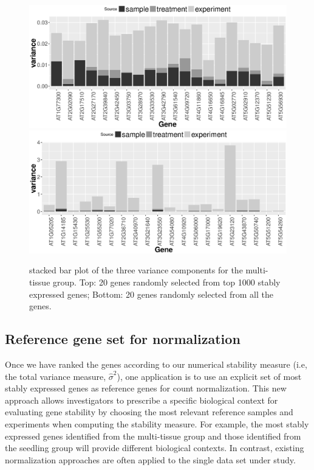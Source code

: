 \documentclass[letterpaper,12pt]{article}
\begin{document}
\begin{figure}[!h]
	\centering
	\includegraphics[width=1\linewidth]{Figures/top1000.eps}
	\includegraphics[width=1\linewidth]{Figures/all.eps}
	\caption{stacked bar plot of the three variance components for the multi-tissue group. Top: 20 genes randomly selected from top 1000 stably expressed genes; Bottom: 20 genes randomly selected from all the genes.}
	\label{fig:all}
\end{figure}


\subsection{Reference gene set for normalization}
\label{Section:commonReference}
Once we have ranked the genes according to our numerical stability measure
(i.e, the total variance measure, $\hat\sigma^2$), one application is to use
an explicit set of most stably expressed genes as reference genes for count
normalization.  This new approach allows investigators to
prescribe a specific biological context for evaluating gene stability by
choosing the most relevant reference samples and experiments when computing
the stability measure.  For example, the most stably expressed genes
identified from the multi-tissue group and those identified from the seedling
group will provide different biological contexts.  In contrast, existing
normalization approaches are often applied to the single data set under study.
\end{document}
